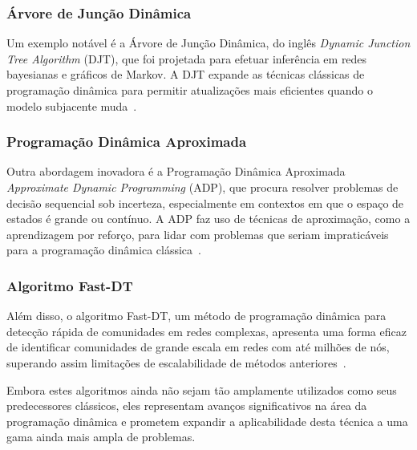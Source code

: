 \subsubsection{Árvore de Junção Dinâmica}

Um exemplo notável é a Árvore de Junção Dinâmica, do inglês \textit{Dynamic Junction Tree Algorithm} (DJT), que foi projetada para efetuar inferência em redes bayesianas e gráficos de Markov. A DJT expande as técnicas clássicas de programação dinâmica para permitir atualizações mais eficientes quando o modelo subjacente muda~\cite{murphy1999loopy}. 

\subsubsection{Programação Dinâmica Aproximada}

Outra abordagem inovadora é a Programação Dinâmica Aproximada \textit{Approximate Dynamic Programming} (ADP), que procura resolver problemas de decisão sequencial sob incerteza, especialmente em contextos em que o espaço de estados é grande ou contínuo. A ADP faz uso de técnicas de aproximação, como a aprendizagem por reforço, para lidar com problemas que seriam impraticáveis para a programação dinâmica clássica~\cite{Powell2007}.

\subsubsection{Algoritmo Fast-DT}

Além disso, o algoritmo Fast-DT, um método de programação dinâmica para detecção rápida de comunidades em redes complexas, apresenta uma forma eficaz de identificar comunidades de grande escala em redes com até milhões de nós, superando assim limitações de escalabilidade de métodos anteriores~\cite{Li2018}. 

Embora estes algoritmos ainda não sejam tão amplamente utilizados como seus predecessores clássicos, eles representam avanços significativos na área da programação dinâmica e prometem expandir a aplicabilidade desta técnica a uma gama ainda mais ampla de problemas.